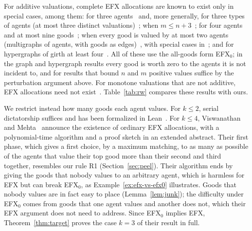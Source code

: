 \documentclass[runningheads,11pt]{llncs}
\newcommand{\efxz}{\texorpdfstring{\mbox{EFX$_0$}}{EFX0}}
\begin{document}
For additive valuations, complete EFX allocations are known to exist only in special cases, among them: for three agents~\cite{ChaudhuryGM20} and, more generally, for three types of agents (at most three distinct valuations)~\cite{HVGNV25}; when $m\le n+3$~\cite{Mahara21}; for four agents and at most nine goods~\cite{AlkassarFM26}; when every good is valued by at most two agents (multigraphs of agents, with goods as edges)~\cite{AfshinmehrAMMS26}, with special cases in~\cite{ChristodoulouFKS23,SgouritsaS25,KavianiSS24}; and for hypergraphs of girth at least four~\cite{LianeasSS26}. All of these use the all-goods form \efxz{}; in the graph and hypergraph results every good is worth zero to the agents it is not incident to, and for results that bound $n$ and $m$ positive values suffice by the perturbation argument above. For monotone valuations that are not additive, EFX allocations need not exist~\cite{AkramiMMSW26,MackenzieS26}. Table~\ref{tab:rw} compares these results with ours.

We restrict instead how many goods each agent values. For $k\le2$, serial dictatorship suffices and has been formalized in Lean~\cite{MrdEfx}. For $k\le4$, Viswanathan and Mehta~\cite{ViswanathanM24} announce the existence of ordinary EFX allocations, with a polynomial-time algorithm and a proof sketch in an extended abstract. Their first phase, which gives a first choice, by a maximum matching, to as many as possible of the agents that value their top good more than their second and third together, resembles our rule R1 (Section~\ref{sec:peel}). Their algorithm ends by giving the goods that nobody values to an arbitrary agent, which is harmless for EFX but can break \efxz{}, as Example~\ref{ex:efx-vs-efx0} illustrates. Goods that nobody values are in fact easy to place (Lemma~\ref{lem:junk}); the difficulty under \efxz{} comes from goods that one agent values and another does not, which their EFX argument does not need to address. Since \efxz{} implies EFX, Theorem~\ref{thm:target} proves the case $k=3$ of their result in full.
\end{document}
